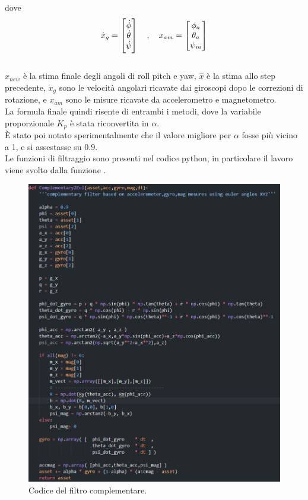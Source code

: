 dove 
\begin{equation}
    \dot{x}_g = \begin{bmatrix}\dot{\phi} \\ \dot{\theta} \\ \dot{\psi}\end{bmatrix} \quad , \quad x_{am} = \begin{bmatrix}\phi_a \\ \theta_a \\ \psi_m\end{bmatrix}
\end{equation}\\

$\hat{x}_{new}$ è la stima finale degli angoli di roll pitch e yaw, $\hat{x}$ è la stima allo step precedente, $\dot{x}_g$ sono le velocità angolari ricavate dai giroscopi dopo le correzioni di rotazione, e $x_{am}$ sono le misure ricavate da accelerometro e magnetometro.\\

La formula finale quindi risente di entrambi i metodi, dove la variabile proporzionale $K_p$ è stata riconvertita in $\alpha$.\\
È stato poi notato sperimentalmente che il valore migliore per $\alpha$ fosse più vicino a 1, e si assestasse su 0.9.\\

Le funzioni di filtraggio sono presenti nel codice python, in particolare il lavoro viene svolto dalla funzione .

\begin{figure}[H]
    \includegraphics[scale=0.6]{immagini/filtercode.png}
    \centering
    \caption{Codice del filtro complementare.}
\end{figure}

\clearpage